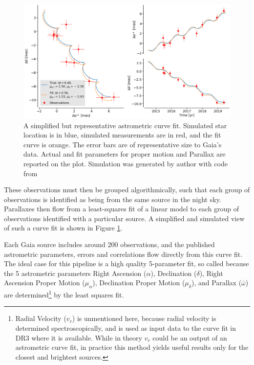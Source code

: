 \documentclass[preprint2]{aastex631}
\begin{document}
\begin{figure}
	\includegraphics[width=\columnwidth]{astrometric-good.png}
	\caption{A simplified but representative astrometric curve fit. Simulated star location is in blue, simulated measurements are in red, and the fit curve is orange. The error bars are of representative size to Gaia's data. Actual and fit parameters for proper motion and Parallax are reported on the plot. Simulation was generated by author with code from \cite{luriGaia2018}}
	\label{fig:goodfit}
\end{figure}

These observations must then be grouped algorithmically, such that each group of observations is identified as being from the same source in the night sky. Parallaxes then flow from a least-squares fit of a linear model to each group of observations identified with a particular source. A simplified and simulated view of such a curve fit is shown in Figure \ref{fig:goodfit}. 

Each Gaia source includes around 200 observations, and the published astrometric parameters, errors and correlations flow directly from this curve fit. The ideal case for this pipeline is a high quality 5-parameter fit, so called because the 5 astrometric parameters Right Ascension ($\alpha$), Declination ($\delta$), Right Ascension Proper Motion ($\mu_\alpha$), Declination Proper Motion ($\mu_\delta$), and Parallax ($\bar{\omega}$) are determined\footnote{Radial Velocity ($v_r$) is unmentioned here, because radial velocity is determined spectroscopically, and is used as input data to the curve fit in DR3 where it is available. While in theory $v_r$ could be an output of an astrometric curve fit, in practice this method yields useful results only for the closest and brightest sources\citep{lindegrenGaia2021a}.} by the least squares fit\citep{lindegrenGaia2021a}.
\end{document}
